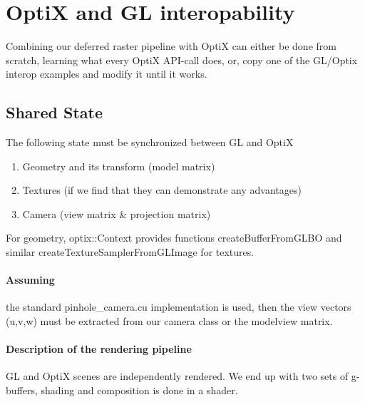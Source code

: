 
\section{OptiX and GL interopability}
\label{sec:OptiXAndGLInteropability}

Combining our deferred raster pipeline with OptiX can either be done from scratch, learning what every OptiX API-call does, or, copy one of the GL/Optix interop examples and modify it until it works. 

\subsection{Shared State}
\label{sec:SharedState}

The following state must be synchronized between GL and OptiX

\begin{enumerate}
	\item Geometry and its transform (model matrix)
	\item Textures (if we find that they can demonstrate any advantages)
	\item Camera (view matrix \& projection matrix)
\end{enumerate}

For geometry, optix::Context provides functions createBufferFromGLBO and similar createTextureSamplerFromGLImage for textures.

\paragraph{Assuming}
\label{sec:Camera}

the standard pinhole\_camera.cu implementation is used, then the view vectors (u,v,w) must be extracted from our camera class or the modelview matrix.

\paragraph{Description of the rendering pipeline}

GL and OptiX scenes are independently rendered. We end up with two sets of g-buffers, shading and composition is done in a shader.

